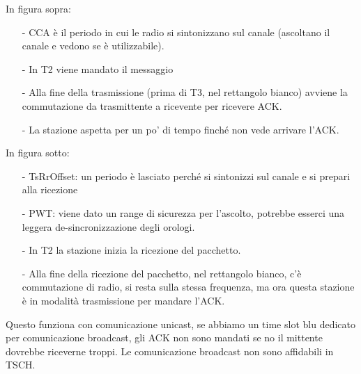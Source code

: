 \documentclass[12pt,italian]{report}
\begin{document}
\noindent In figura sopra:
\begin{itemize}
    \item [-] CCA è il periodo in cui le radio si sintonizzano sul canale (ascoltano il canale e vedono se è utilizzabile). 
    \item [-] In T2 viene mandato il messaggio
    \item [-] Alla fine della trasmissione (prima di T3, nel rettangolo bianco) avviene la commutazione da trasmittente a ricevente per ricevere ACK.
    \item [-] La stazione aspetta per un po' di tempo finché non vede arrivare l'ACK. 
\end{itemize}

\noindent In figura sotto:
\begin{itemize}
    \item [-] TsRrOffset: un periodo è lasciato perché si sintonizzi sul canale e si prepari alla ricezione 
    \item [-] PWT: viene dato un range di sicurezza per l'ascolto, potrebbe esserci una leggera de-sincronizzazione degli orologi. 
    \item [-] In T2 la stazione inizia la ricezione del pacchetto.
    \item [-] Alla fine della ricezione del pacchetto, nel rettangolo bianco, c'è commutazione di radio, si resta sulla stessa frequenza, ma ora questa stazione è in modalità trasmissione per mandare l'ACK.
\end{itemize}
Questo funziona con comunicazione unicast, se abbiamo un time slot blu dedicato per comunicazione broadcast, gli ACK non sono mandati se no il mittente dovrebbe riceverne troppi. Le comunicazione broadcast non sono affidabili in TSCH. 
\end{document}
